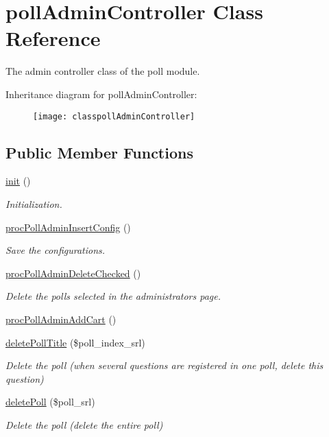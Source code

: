 \hypertarget{classpollAdminController}{}\section{poll\+Admin\+Controller Class Reference}
\label{classpollAdminController}


The admin controller class of the poll module.  


Inheritance diagram for poll\+Admin\+Controller\+:\begin{figure}[H]
\begin{center}
\leavevmode
\texttt{[image: classpollAdminController]}
\end{center}
\end{figure}
\subsection*{Public Member Functions}
\begin{DoxyCompactItemize}
\item 
\hyperlink{classpollAdminController_adaf2c123a1f123bcb92de4f373ead8a9}{init} ()
\begin{DoxyCompactList}\small\item\em Initialization. \end{DoxyCompactList}\item 
\hyperlink{classpollAdminController_ab34f3cb8a5b40217ed0acdaaa11ee0ad}{proc\+Poll\+Admin\+Insert\+Config} ()
\begin{DoxyCompactList}\small\item\em Save the configurations. \end{DoxyCompactList}\item 
\hyperlink{classpollAdminController_af1a9c9f33253af68ac12e4c026bd699a}{proc\+Poll\+Admin\+Delete\+Checked} ()
\begin{DoxyCompactList}\small\item\em Delete the polls selected in the administrator\textquotesingle{}s page. \end{DoxyCompactList}\item 
\hyperlink{classpollAdminController_a148e3ec22f5a872647e7208bb853d3a1}{proc\+Poll\+Admin\+Add\+Cart} ()
\item 
\hyperlink{classpollAdminController_acd355746ff4a145b974b2a95b9c0eda9}{delete\+Poll\+Title} (\$poll\+\_\+index\+\_\+srl)
\begin{DoxyCompactList}\small\item\em Delete the poll (when several questions are registered in one poll, delete this question) \end{DoxyCompactList}\item 
\hyperlink{classpollAdminController_ab8fa4ab256e902120f27dac1edea8f57}{delete\+Poll} (\$poll\+\_\+srl)
\begin{DoxyCompactList}\small\item\em Delete the poll (delete the entire poll) \end{DoxyCompactList}\end{DoxyCompactItemize}

